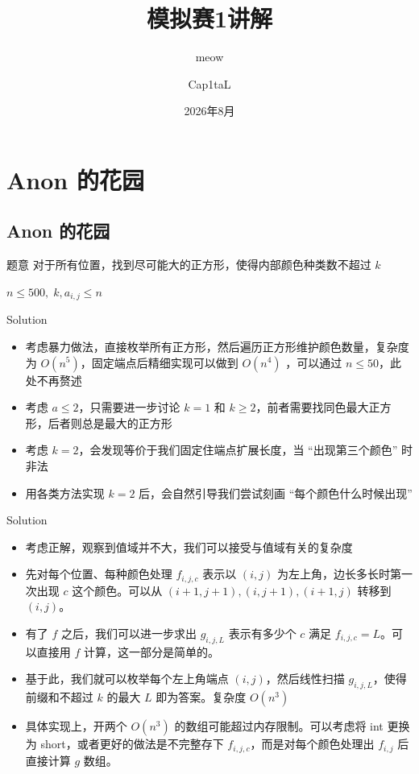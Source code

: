 ﻿\documentclass[aspectratio=169]{ctexbeamer}
\author{Cap1taL}
\title{模拟赛1讲解}
\subtitle{meow}
\date{2026年8月}
\begin{document}
\kaishu

\begin{frame}
    \titlepage
\end{frame}



\section{Anon 的花园}

\subsection{Anon 的花园}
\begin{frame}{题意}
    对于所有位置，找到尽可能大的正方形，使得内部颜色种类数不超过 $k$

    $n\le 500,\; k,a_{i,j}\le n$
\end{frame}

\begin{frame}{Solution}
    \begin{itemize}
        \item 考虑暴力做法，直接枚举所有正方形，然后遍历正方形维护颜色数量，复杂度为 $O(n^5)$，固定端点后精细实现可以做到 $O(n^4)$ ，可以通过 $n\le 50$，此处不再赘述
        \item 考虑 $a\le 2$，只需要进一步讨论 $k=1$ 和 $k\ge 2$，前者需要找同色最大正方形，后者则总是最大的正方形
        \item 考虑 $k=2$，会发现等价于我们固定住端点扩展长度，当 “出现第三个颜色” 时非法
        \item 用各类方法实现 $k=2$ 后，会自然引导我们尝试刻画 “每个颜色什么时候出现”
    \end{itemize}
\end{frame}

\begin{frame}{Solution}
    \begin{itemize}
        \item 考虑正解，观察到值域并不大，我们可以接受与值域有关的复杂度
        \item 先对每个位置、每种颜色处理 $f_{i,j,c}$ 表示以 $(i,j)$ 为左上角，边长多长时第一次出现 $c$ 这个颜色。可以从 $(i+1,j+1),(i,j+1),(i+1,j)$ 转移到 $(i,j)$。
        \item 有了 $f$ 之后，我们可以进一步求出 $g_{i,j,L}$ 表示有多少个 $c$ 满足 $f_{i,j,c}=L$。可以直接用 $f$ 计算，这一部分是简单的。
        \item 基于此，我们就可以枚举每个左上角端点 $(i,j)$，然后线性扫描 $g_{i,j,L}$，使得前缀和不超过 $k$ 的最大 $L$ 即为答案。复杂度 $O(n^3)$
        \item 具体实现上，开两个 $O(n^3)$ 的数组可能超过内存限制。可以考虑将 int 更换为 short，或者更好的做法是不完整存下 $f_{i,j,c}$，而是对每个颜色处理出 $f_{i,j}$ 后直接计算 $g$ 数组。
    \end{itemize}
\end{frame}
\end{document}
